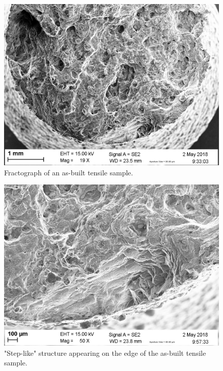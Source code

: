 \begin{figure}[ht]
	\centering
	\centerline{\includegraphics[scale=0.50]{Images/frac-01-04.png}}
	\decoRule
	\caption[Fractograph of an as-built tensile sample]{Fractograph of an as-built tensile sample.}
	\label{fig:ms_ab_frac}
\end{figure}

\begin{figure}[ht]
	\centering
	\centerline{\includegraphics[scale=0.35]{Images/frac-01-12.jpg}}
	\decoRule
	\caption["Step-like" structure appearing on the edge of the as-built tensile sample]{"Step-like" structure appearing on the edge of the as-built tensile sample.}
	\label{fig:ms_ab_frac2}
\end{figure}

